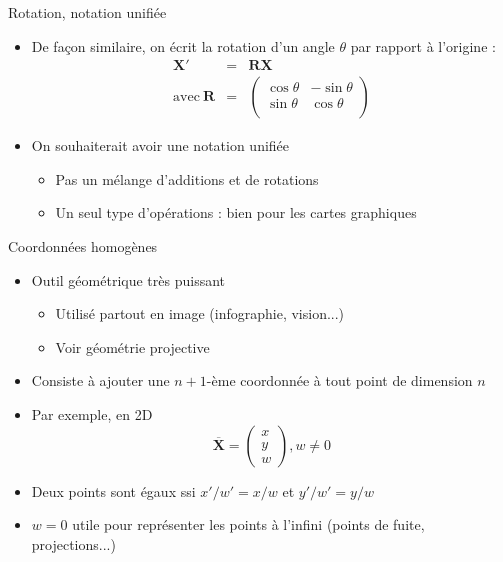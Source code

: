 \begin{frame}{Rotation, notation unifiée}
\begin{itemize}
\item De façon similaire, on écrit la rotation d'un angle $\theta$ par rapport à l'origine :
\begin{eqnarray*}
\mathbf{X'} & = & \mathbf{R}\mathbf{X} \\
\mathrm{avec}\  \mathbf{R} & = & \left(
\begin{array}{cc}
\cos \theta & -\sin \theta \\
\sin \theta & \cos \theta \\
\end{array}
\right)
\end{eqnarray*}
\item On souhaiterait avoir une notation unifiée
\begin{itemize}
\item Pas un mélange d'additions et de rotations
\item Un seul type d'opérations : bien pour les cartes graphiques
\end{itemize}
\end{itemize}
\end{frame}

\begin{frame}{Coordonnées homogènes}
\begin{itemize}
\item Outil géométrique très puissant
\begin{itemize}
\item Utilisé partout en image (infographie, vision...)
\item Voir géométrie projective
\end{itemize}
\item Consiste à ajouter une $n+1$-ème coordonnée à tout point de dimension $n$
\item Par exemple, en 2D
$$ \mathbf{\overline{X}} = \left( \begin{array}{c} x \\ y \\ w
\end{array}\right), w \neq 0 $$
\item Deux points sont égaux ssi $x'/w'=x/w$ et $y'/w'=y/w$
\item $w=0$ utile pour représenter les points à l'infini (points de fuite, projections...)
\end{itemize}
\end{frame}

